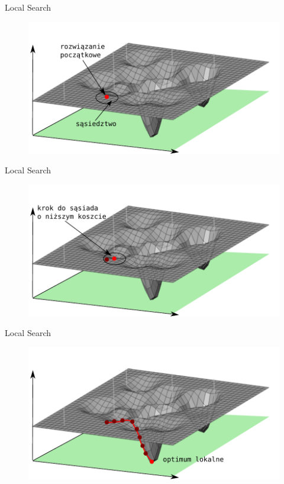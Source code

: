 \documentclass[blue]{beamer}
\begin{document}
\begin{frame}{Local Search}
\begin{figure}
\includegraphics[scale=.7]{ss2.pdf}
\end{figure}
\end{frame}

\begin{frame}{Local Search}
\begin{figure}
\includegraphics[scale=.7]{ss3.pdf}
\end{figure}
\end{frame}

\begin{frame}{Local Search}
\begin{figure}
\includegraphics[scale=.7]{ss4.pdf}
\end{figure}
\end{frame}
\end{document}
